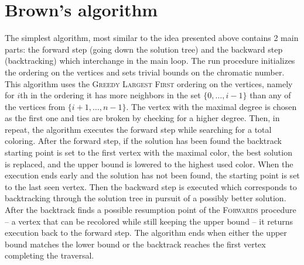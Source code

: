 \section{Brown's algorithm}
\label{sec:BA}
The simplest algorithm, most similar to the idea presented above contains 2 main parts: the forward step (going down the solution tree) and the backward step (backtracking) which interchange in the main loop. The run procedure initializes the ordering on the vertices and sets trivial bounds on the chromatic number. This algorithm uses the \textsc{Greedy Largest First} ordering on the vertices, namely for $i$th in the ordering it has more neighbors in the set $\{0,  \dots, i-1\}$ than any of the vertices from $\{i+1, \dots, n-1\}$. The vertex with the maximal degree is chosen as the first one and ties are broken by checking for a higher degree. Then, in repeat, the algorithm executes the forward step while searching for a total coloring. After the forward step, if the solution has been found the backtrack starting point is set to the first vertex with the maximal color, the best solution is replaced, and the upper bound is lowered to the highest used color. When the execution ends early and the solution has not been found, the starting point is set to the last seen vertex. Then the backward step is executed which corresponds to backtracking through the solution tree in pursuit of a possibly better solution. After the backtrack finds a possible resumption point of the \textsc{Forwards} procedure -- a vertex that can be recolored while still keeping the upper bound -- it returns execution back to the forward step. The algorithm ends when either the upper bound matches the lower bound or the backtrack reaches the first vertex completing the traversal.
\newpage
\begin{alg}
	\label{alg:mainloopBrown}
 \end{alg}

